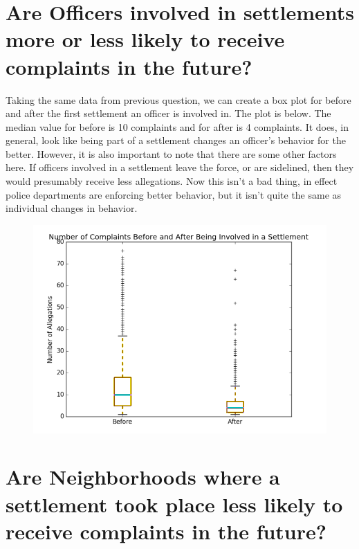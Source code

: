 \documentclass{article}
\begin{document}
\section{Are Officers involved in settlements more or less likely to receive complaints in the future?}

Taking the same data from previous question, we can create a box plot for before and after the first settlement an officer is involved in. The plot is below. The median value for before is 10 complaints and for after is 4 complaints. It does, in general, look like being part of a settlement changes an officer's behavior for the better. However, it is also important to note that there are some other factors here. If officers involved in a settlement leave the force, or are sidelined, then they would presumably receive less allegations. Now this isn't a bad thing, in effect police departments are enforcing better behavior, but it isn't quite the same as individual changes in behavior.

\begin{figure}[h!]
\centering
\includegraphics[width=\textwidth]{settb.png}
\end{figure}

\FloatBarrier


\section{Are Neighborhoods where a settlement took place less likely to receive complaints in the future?}
\end{document}
